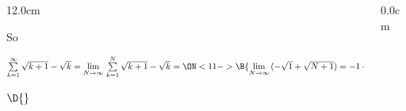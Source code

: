 \begin{frame}
\begin{columns}
\begin{column}{12.0cm}
	\vspace{0.2cm}
	
So \\

\vspace{0.4cm}

$\sum \limits_{k = 1}^{\infty} \sqrt{k+1} - \sqrt{k} = \lim \limits_{N \to \infty}\, \sum \limits_{k = 1}^{N} \sqrt{k+1} - \sqrt{k} = \ON<11->{\B{\lim \limits_{N \to \infty}\, (-\sqrt{1} + \sqrt{N+1}) = -1 + \infty = \infty}}$ \\

\vspace{0.2cm}

\vspace{4.0cm}

$\D{}$

\vspace{6.5cm}

\end{column}
\begin{column}{0.0cm}\end{column}
\end{columns}
\end{frame}

